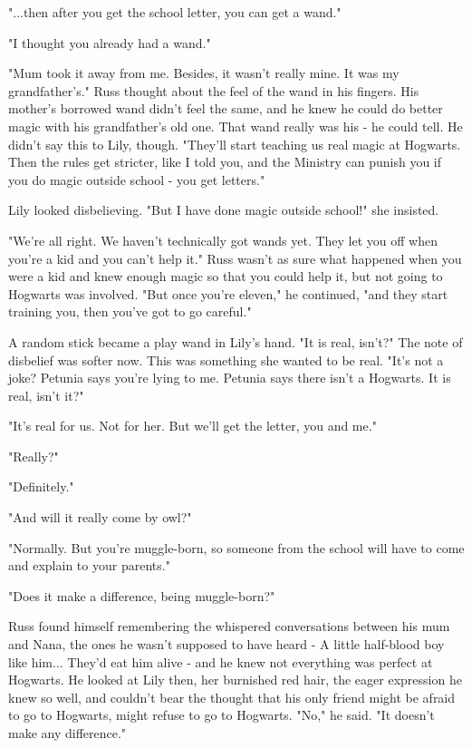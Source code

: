 \documentclass[a4paper,11pt]{article}
\begin{document}
"...then after you get the school letter, you can get a wand."

"I thought you already had a wand."

"Mum took it away from me. Besides, it wasn't really mine. It was my grandfather's." Russ thought about the feel of the wand in his fingers. His mother's borrowed wand didn't feel the same, and he knew he could do better magic with his grandfather's old one. That wand really was his - he could tell. He didn't say this to Lily, though. "They'll start teaching us real magic at Hogwarts. Then the rules get stricter, like I told you, and the Ministry can punish you if you do magic outside school - you get letters."

Lily looked disbelieving. "But I have done magic outside school!" she insisted.

"We're all right. We haven't technically got wands yet. They let you off when you're a kid and you can't help it." Russ wasn't as sure what happened when you were a kid and knew enough magic so that you could help it, but not going to Hogwarts was involved. "But once you're eleven," he continued, "and they start training you, then you've got to go careful."

A random stick became a play wand in Lily's hand. "It is real, isn't?" The note of disbelief was softer now. This was something she wanted to be real. "It's not a joke? Petunia says you're lying to me. Petunia says there isn't a Hogwarts. It is real, isn't it?"

"It's real for us. Not for her. But we'll get the letter, you and me."

"Really?"

"Definitely."

"And will it really come by owl?"

"Normally. But you're muggle-born, so someone from the school will have to come and explain to your parents."

"Does it make a difference, being muggle-born?"

Russ found himself remembering the whispered conversations between his mum and Nana, the ones he wasn't supposed to have heard - A little half-blood boy like him... They'd eat him alive - and he knew not everything was perfect at Hogwarts. He looked at Lily then, her burnished red hair, the eager expression he knew so well, and couldn't bear the thought that his only friend might be afraid to go to Hogwarts, might refuse to go to Hogwarts. "No," he said. "It doesn't make any difference."
\end{document}

